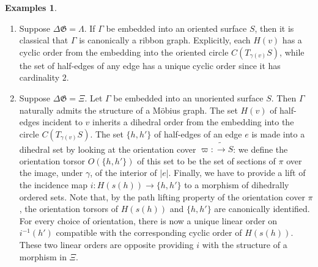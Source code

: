 \documentclass[english,11pt,leqno]{article}
\def\Gen{\mathfrak{G}}
\def\DG{ {\Delta \Gen}}
\theoremstyle{definition}
\newtheorem{exas}[thm]{Examples}
\theoremstyle{remark}
\numberwithin{equation}{section}
\begin{document}
\begin{exas}
\begin{enumerate}
	\item Suppose $\DG=\Lambda$. If $\Gamma$ be embedded into an oriented surface $S$, then it is classical that $\Gamma$
		is canonically a ribbon graph. Explicitly, each $H(v)$ has a cyclic order from the embedding
		into the oriented circle $C(T_{\gamma(v)} S)$, while the set of half-edges of any edge
		has a unique cyclic order since it has cardinality $2$. 
			
	\item Suppose $\DG=\Xi$.
		 Let $\Gamma$ be embedded into an unoriented surface $S$. Then $\Gamma$
		naturally admits the structure of a M\"obius graph.  The set 		$H(v)$ of half-edges incident to $v$
		inherits a dihedral order from the embedding into the circle $C(T_{\gamma(v)} S)$.
		The set $\{h,h'\}$ of half-edges of an edge $e$ is made into a dihedral set by looking at
		the orientation cover $\varpi: \widetilde \to S$: we define the orientation torsor $O(\{h,h'\})$
		of this set to be the set of sections of $\pi$ over the image, under $\gamma$, of the interior of $|e|$. 
		 Finally, we have to provide a lift of 
		the incidence map $i: H(s(h)) \to \{h,h'\}$ to a morphism of dihedrally ordered
		sets. Note that, by the path lifting property of the orientation cover $\pi$, 
		the orientation torsors of $H(s(h))$ and $\{h,h'\}$ are canonically
		identified. For every choice of orientation, there is now a unique linear
		order on $i^{-1}(h')$ compatible with the corresponding cyclic order of
		$H(s(h))$. These two linear orders are opposite providing $i$ with the
		structure of a morphism in ${\Xi}$.
			

\end{enumerate}
\end{exas}
\end{document}
